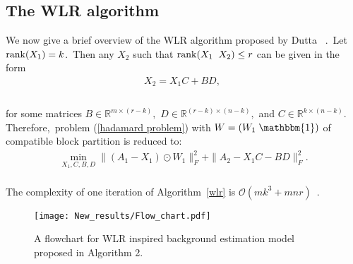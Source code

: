 \documentclass[10pt,twocolumn,letterpaper]{article}
\begin{document}
\vspace{-0.0in}
\subsection{The WLR algorithm}
\vspace{-0.0in}
We now give a brief overview of the WLR algorithm proposed by Dutta \etal~\cite{duttali,duttali_bg}.~Let ${\rm rank}(X_1)=k$.~Then any $X_2$ such that ${\rm rank}(X_1\;\;X_2)\le r$ can be given in the form~\\[-0.2in]
\begin{align*}X_2=X_1C+BD,~\\[-0.3in]\end{align*}
~\\[-0.1in]
for some matrices $B\in\mathbb{R}^{m\times (r-k)},$ $D\in\mathbb{R}^{(r-k)\times (n-k)},$ and $C\in\mathbb{R}^{k\times (n-k)}.$ Therefore,~problem (\ref{hadamard problem}) with $W=(W_1\;\mathbbm{1})$ of compatible block partition is reduced to:
~\\[-0.12in]
\begin{align}\label{main problem 2}
\min_{X_1,C,B,D}\|(A_1-X_1)\odot W_1\|_F^2+\|A_2-X_1C-BD\|_F^2.
\end{align}
~\\[-0.12in]
The complexity of one iteration of Algorithm~\ref{wlr} is $\mathcal{O}(mk^3+mnr)$~\cite{duttali}.

\begin{figure*}
    \centering
    \texttt{[image: New\_results/Flow\_chart.pdf]}
    \caption{A flowchart for WLR inspired background estimation model proposed in Algorithm 2.}
    \label{algo_flowchart}
\end{figure*}

\vspace{-0.0in}
\end{document}
